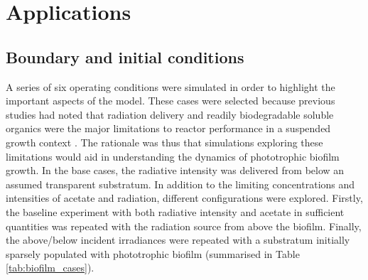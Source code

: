 \section{Applications}
\subsection{Boundary and initial conditions}
A series of six operating conditions were simulated in order to highlight the important aspects of the model. These cases were selected because previous studies had noted that radiation delivery and readily biodegradable soluble organics were the major limitations to reactor performance in a suspended growth context \cite{Hulsen2016, Hulsen2016a}. The rationale was thus that simulations exploring these limitations would aid in understanding the dynamics of phototrophic biofilm growth. In the base cases, the radiative intensity was delivered from below an assumed transparent substratum. In addition to the limiting concentrations and intensities of acetate and radiation, different configurations were explored. Firstly, the baseline experiment with both radiative intensity and acetate in sufficient quantities was repeated with the radiation source from above the biofilm. Finally, the above/below incident irradiances were repeated with a substratum initially sparsely populated with phototrophic biofilm (summarised in Table \ref{tab:biofilm_cases}). 

